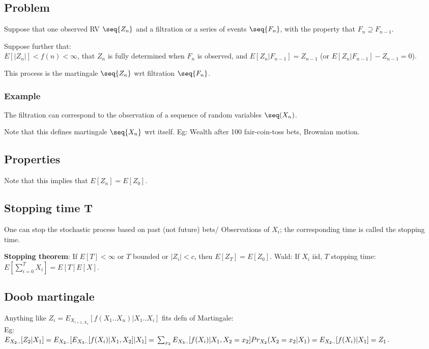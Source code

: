 \documentclass[oneside, article]{memoir}
\begin{document}
\subsection{Problem}
Suppose that one observed RV $\seq{Z_n}$ and a filtration or a series of events $\seq{F_n}$, with the property that $F_n \supseteq F_{n-1}$.

Suppose further that: \\$E[|Z_{n}|] < f(n) < \infty$, that $Z_n$ is fully determined when $F_n$ is observed, and $E[Z_{n}|F_{n-1}] = Z_{n-1}$ (or $E[Z_{n}|F_{n-1}] - Z_{n-1} = 0$).

This process is the martingale $\seq{Z_n}$ wrt filtration $\seq{F_n}$.

\subsubsection{Example}
The filtration can correspond to the observation of a sequence of random variables $\seq(X_n)$.

Note that this defines martingale $\seq{X_{n}}$ wrt itself. Eg: Wealth after 100 fair-coin-toss bets, Brownian motion.

\subsection{Properties}
Note that this implies that  $E[Z_n] = E[Z_0]$.

\subsection{Stopping time T}
One can stop the stochastic process based on past (not future) bets/ Observations of $X_i$; the corresponding time is called the stopping time.

\textbf{Stopping theorem}: If $E[T] < \infty$ or $T$ bounded or $|Z_{i}|<c$, then $E[Z_{T}]=E[Z_{0}]$. Wald: If $X_{i}$ iid, $T$ stopping time: $E[\sum_{i=0}^{T}X_{i}] =E[T]E[X]$.


\subsection{Doob martingale}
Anything like $Z_{i}=E_{X_{i+1 .. X_{n}}}[f(X_{1}..X_{n})|X_{1}..X_{i}]$ fits defn of Martingale: \\
Eg: \\
$E_{X_{2} .. }[Z_{2}|X_{1}] = E_{X_{2} ..}[E_{X_{3} ..}[f(X_{i})| X_{1}, X_{2}]| X_{1}] = \\
\sum_{x_{2}} E_{X_{3} ..}[f(X_{i})| X_{1}, X_{2} = x_{2}] Pr_{X_{2}}(X_{2} = x_{2}|X_{1})= E_{X_{2} ..}[f(X_{i})| X_{1}] = Z_{1}$.
\end{document}
